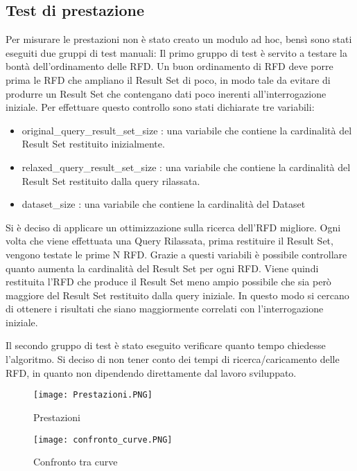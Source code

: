 \subsection{Test di prestazione}
Per misurare le prestazioni non è stato creato un modulo ad hoc, bensì sono stati eseguiti due gruppi di test manuali:
Il primo gruppo di test è servito a testare la bontà dell'ordinamento delle RFD. 
Un buon ordinamento di RFD deve porre prima le RFD che ampliano il Result Set di poco,
in modo tale da evitare di produrre un Result Set che contengano dati poco inerenti all'interrogazione iniziale.
Per effettuare questo controllo sono stati dichiarate tre variabili:
\begin{itemize}
    \item original{\_}query{\_}result{\_}set{\_}size : una variabile che contiene la cardinalità del Result Set restituito inizialmente.
    \item relaxed{\_}query{\_}result{\_}set{\_}size : una variabile che contiene la cardinalità del Result Set restituito dalla query rilassata.
    \item dataset{\_}size : una variabile che contiene la cardinalità del Dataset
\end{itemize}



Si è deciso di applicare un ottimizzazione sulla ricerca dell'RFD migliore. 
Ogni volta che viene effettuata una Query Rilassata, prima restituire il Result Set, vengono testate le prime N RFD.
Grazie a questi variabili è possibile controllare quanto aumenta la cardinalità del Result Set per ogni RFD. Viene quindi restituita l'RFD che produce il Result Set meno ampio possibile che sia però maggiore del Result Set restituito dalla query iniziale. In questo modo si cercano di ottenere i risultati che siano maggiormente correlati con l'interrogazione iniziale.

Il secondo gruppo di test è stato eseguito verificare quanto tempo chiedesse l'algoritmo.
Si deciso di non tener conto dei tempi di ricerca/caricamento delle RFD, in quanto non dipendendo direttamente dal lavoro sviluppato.

\begin{figure}[H]
    \centering
    \texttt{[image: Prestazioni.PNG]}
    \caption{Prestazioni}
    \label{fig:prestazioni}
\end{figure}

\begin{figure}[H]
    \centering
    \texttt{[image: confronto\_curve.PNG]}
    \caption{Confronto tra curve}
    \label{fig:confronto_curve}
\end{figure}

